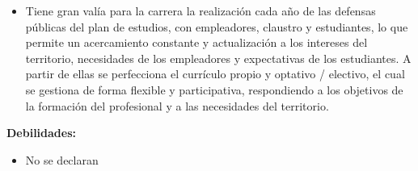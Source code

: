 \begin{itemize}
	\item Tiene gran valía para la carrera la realización cada año de las defensas públicas del plan de estudios, con empleadores, claustro y estudiantes, lo que permite un acercamiento constante y actualización a los intereses del territorio, necesidades de los empleadores y expectativas de los estudiantes. A partir de ellas se perfecciona el currículo propio y optativo / electivo, el cual se gestiona de forma flexible y participativa, respondiendo a los objetivos de la formación del profesional y a las necesidades del territorio.
\end{itemize}


\textbf{Debilidades:}
\begin{itemize}
	\item No se declaran 
\end{itemize}